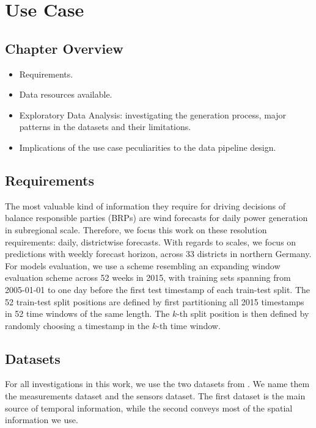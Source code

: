 \graphicspath{{./figures/usecase/}}

\chapter{Use Case}

\section*{Chapter Overview}
\begin{itemize}
    \item Requirements.
    \item Data resources available.
    \item Exploratory Data Analysis: investigating the generation process, major patterns in the datasets and their limitations.
    \item Implications of the use case peculiarities to the data pipeline design.
\end{itemize}
\pagebreak


\section{Requirements}\label{sec:reqs}
The most valuable kind of information they require for driving decisions of balance responsible parties (BRPs) are wind forecasts for daily power generation in subregional scale.
Therefore, we focus this work on these resolution requirements: daily, districtwise forecasts.
With regards to scales, we focus on predictions with weekly forecast horizon, across 33 districts in northern Germany.
For models evaluation, we use a scheme resembling an expanding window evaluation scheme across 52 weeks in 2015, with training sets spanning from 2005-01-01 to one day before the first test timestamp of each train-test split.
The 52 train-test split positions are defined by first partitioning all 2015 timestamps in 52 time windows of the same length.
The $k$-th split position is then defined by randomly choosing a timestamp in the $k$-th time window.

\section{Datasets}\label{sec:datasets}
For all investigations in this work, we use the two datasets from \cite{becker2017completion}.
We name them the measurements dataset and the sensors dataset.
The first dataset is the main source of temporal information, while the second conveys most of the spatial information we use.

